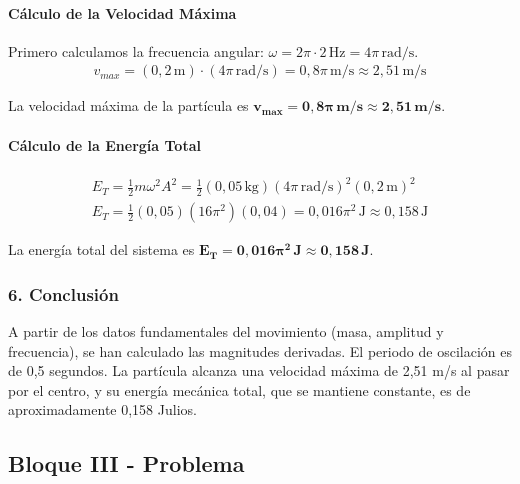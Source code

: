 \paragraph{Cálculo de la Velocidad Máxima}
Primero calculamos la frecuencia angular: $\omega = 2\pi \cdot 2\,\text{Hz} = 4\pi\,\text{rad/s}$.
\begin{gather}
    v_{max} = (0,2\,\text{m}) \cdot (4\pi\,\text{rad/s}) = 0,8\pi\,\text{m/s} \approx 2,51\,\text{m/s}
\end{gather}
\begin{cajaresultado}
    La velocidad máxima de la partícula es $\boldsymbol{v_{max} = 0,8\pi\,\textbf{m/s} \approx 2,51\,\textbf{m/s}}$.
\end{cajaresultado}

\paragraph{Cálculo de la Energía Total}
\begin{gather}
    E_T = \frac{1}{2}m\omega^2A^2 = \frac{1}{2}(0,05\,\text{kg})(4\pi\,\text{rad/s})^2(0,2\,\text{m})^2 \\
    E_T = \frac{1}{2}(0,05)(16\pi^2)(0,04) = 0,016\pi^2\,\text{J} \approx 0,158\,\text{J}
\end{gather}
\begin{cajaresultado}
    La energía total del sistema es $\boldsymbol{E_T = 0,016\pi^2\,\textbf{J} \approx 0,158\,\textbf{J}}$.
\end{cajaresultado}

\subsubsection*{6. Conclusión}
\begin{cajaconclusion}
A partir de los datos fundamentales del movimiento (masa, amplitud y frecuencia), se han calculado las magnitudes derivadas. El periodo de oscilación es de 0,5 segundos. La partícula alcanza una velocidad máxima de 2,51 m/s al pasar por el centro, y su energía mecánica total, que se mantiene constante, es de aproximadamente 0,158 Julios.
\end{cajaconclusion}

\newpage

\subsection{Bloque III - Problema}
\label{subsec:A3_2014_jul_ext}

